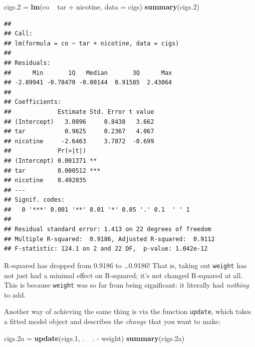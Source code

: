 \documentclass[]{tufte-book}
\newenvironment{Shaded}{}{}
\newcommand{\DataTypeTok}[1]{\textcolor[rgb]{0.56,0.13,0.00}{#1}}
\newcommand{\FloatTok}[1]{\textcolor[rgb]{0.25,0.63,0.44}{#1}}
\newcommand{\KeywordTok}[1]{\textcolor[rgb]{0.00,0.44,0.13}{\textbf{#1}}}
\newcommand{\NormalTok}[1]{#1}
\newcommand{\OperatorTok}[1]{\textcolor[rgb]{0.40,0.40,0.40}{#1}}
\newcommand{\StringTok}[1]{\textcolor[rgb]{0.25,0.44,0.63}{#1}}
\theoremstyle{definition}
\theoremstyle{definition}
\theoremstyle{definition}
\theoremstyle{remark}
\begin{document}
\begin{Shaded}
\begin{Highlighting}[]
\NormalTok{cigs}\FloatTok{.2}\NormalTok{ =}\StringTok{ }\KeywordTok{lm}\NormalTok{(co }\OperatorTok{~}\StringTok{ }\NormalTok{tar }\OperatorTok{+}\StringTok{ }\NormalTok{nicotine, }\DataTypeTok{data =}\NormalTok{ cigs)}
\KeywordTok{summary}\NormalTok{(cigs}\FloatTok{.2}\NormalTok{)}
\end{Highlighting}
\end{Shaded}

\begin{verbatim}
## 
## Call:
## lm(formula = co ~ tar + nicotine, data = cigs)
## 
## Residuals:
##      Min       1Q   Median       3Q      Max 
## -2.89941 -0.78470 -0.00144  0.91585  2.43064 
## 
## Coefficients:
##             Estimate Std. Error t value
## (Intercept)   3.0896     0.8438   3.662
## tar           0.9625     0.2367   4.067
## nicotine     -2.6463     3.7872  -0.699
##             Pr(>|t|)    
## (Intercept) 0.001371 ** 
## tar         0.000512 ***
## nicotine    0.492035    
## ---
## Signif. codes:  
##   0 '***' 0.001 '**' 0.01 '*' 0.05 '.' 0.1  ' ' 1
## 
## Residual standard error: 1.413 on 22 degrees of freedom
## Multiple R-squared:  0.9186, Adjusted R-squared:  0.9112 
## F-statistic: 124.1 on 2 and 22 DF,  p-value: 1.042e-12
\end{verbatim}

R-squared has dropped from 0.9186 to \ldots 0.9186! That is, taking out
\texttt{weight} has not just had a minimal effect on R-squared; it's not
changed R-squared at all. This is because \texttt{weight} was so far
from being significant: it literally had \emph{nothing} to add.

Another way of achieving the same thing is via the function
\texttt{update}, which takes a fitted model object and describes the
\emph{change} that you want to make:

\begin{Shaded}
\begin{Highlighting}[]
\NormalTok{cigs}\FloatTok{.2}\NormalTok{a =}\StringTok{ }\KeywordTok{update}\NormalTok{(cigs}\FloatTok{.1}\NormalTok{, . }\OperatorTok{~}\StringTok{ }\NormalTok{. }\OperatorTok{-}\StringTok{ }\NormalTok{weight)}
\KeywordTok{summary}\NormalTok{(cigs}\FloatTok{.2}\NormalTok{a)}
\end{Highlighting}
\end{Shaded}
\end{document}
